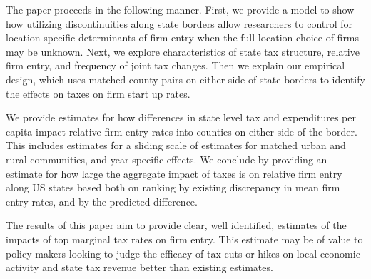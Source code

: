 The paper proceeds in the following manner. First, we provide a model to show how utilizing discontinuities along state borders allow researchers to control for location specific determinants of firm entry when the full location choice of firms may be unknown. Next, we explore characteristics of state tax structure, relative firm entry, and frequency of joint tax changes. Then we explain our empirical design, which uses matched county pairs on either side of state borders to identify the effects on taxes on firm start up rates.

We provide estimates for how differences in state level tax and expenditures per capita impact relative firm entry rates into counties on either side of the border. This includes estimates for a sliding scale of estimates for matched urban and rural communities, and year specific effects. We conclude by providing an estimate for how large the aggregate impact of taxes is on relative firm entry along US states based both on ranking by existing discrepancy in mean firm entry rates, and by the predicted difference.

The results of this paper aim to provide clear, well identified, estimates of the impacts of top marginal tax rates on firm entry. This estimate may be of value to policy makers looking to judge the efficacy of tax cuts or hikes on local economic activity and state tax revenue better than existing estimates.